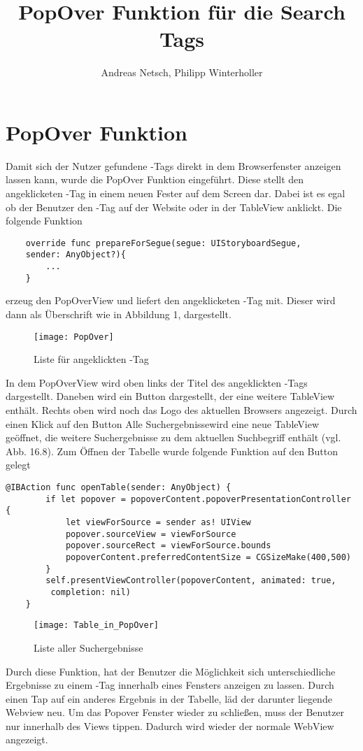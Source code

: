 
\title{PopOver Funktion für die Search Tags}
\author{Andreas Netsch, Philipp Winterholler}

\section{PopOver Funktion}

Damit sich der Nutzer gefundene \SEARCH-Tags direkt in dem Browserfenster anzeigen lassen kann, wurde die PopOver Funktion eingeführt. Diese stellt den angeklicketen \SEARCH-Tag in einem neuen Fester auf dem Screen dar. Dabei ist es egal ob der Benutzer den \SEARCH-Tag auf der Website oder in der TableView anklickt.
Die folgende Funktion 
\begin{lstlisting}
    override func prepareForSegue(segue: UIStoryboardSegue, 
    sender: AnyObject?){
        ...
    }
\end{lstlisting}

erzeug den PopOverView und liefert den angeklicketen \SEARCH-Tag mit. Dieser wird dann als Überschrift wie in Abbildung 1, dargestellt. 
\begin{figure}[htb]
    \centering
    \texttt{[image: PopOver]}
    \caption{Liste für angeklickten \SEARCH-Tag}
    \label{fig:angeklickt}
\end{figure}
In dem PopOverView wird oben links der Titel des angeklickten \SEARCH-Tags dargestellt. Daneben wird ein Button dargestellt, der eine weitere TableView enthält. Rechts oben wird noch das Logo des aktuellen Browsers angezeigt. Durch einen Klick auf den Button \glqq Alle Suchergebnisse\grqq  wird eine neue TableView geöffnet, die weitere Suchergebnisse zu dem aktuellen Suchbegriff enthält (vgl. Abb. 16.8). Zum Öffnen der Tabelle wurde folgende Funktion auf den Button gelegt
\begin{lstlisting}
@IBAction func openTable(sender: AnyObject) {
        if let popover = popoverContent.popoverPresentationController {
            let viewForSource = sender as! UIView
            popover.sourceView = viewForSource
            popover.sourceRect = viewForSource.bounds
            popoverContent.preferredContentSize = CGSizeMake(400,500)
        }        
        self.presentViewController(popoverContent, animated: true,
         completion: nil)
    }
\end{lstlisting}
\begin{figure}[htb]
    \centering
    \texttt{[image: Table\_in\_PopOver]}
    \caption{Liste aller Suchergebnisse}
    \label{fig:Alle Suchergebnisse}
\end{figure}
Durch diese Funktion, hat der Benutzer die Möglichkeit sich unterschiedliche Ergebnisse zu einem \SEARCH-Tag innerhalb eines Fensters anzeigen zu lassen. Durch einen Tap auf ein anderes Ergebnis in der Tabelle, läd der darunter liegende Webview neu. Um das Popover Fenster wieder zu schließen, muss der Benutzer nur innerhalb des Views tippen. Dadurch wird wieder der normale WebView angezeigt.
